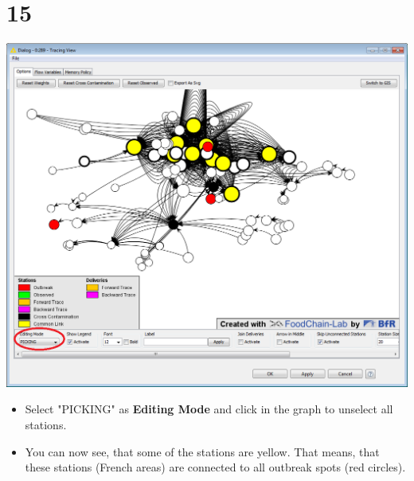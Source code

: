 \documentclass{beamer}
\begin{document}
\section{15}
\begin{frame}
	\begin{center}
  		\includegraphics[height=0.6\textheight]{15.png}
	\end{center}
	\begin{itemize}
		\item Select "PICKING" as \textbf{Editing Mode} and click in the graph to unselect all stations.
		\item You can now see, that some of the stations are yellow. That means, that these stations (French areas) are connected to all outbreak spots (red circles).
	\end{itemize}
\end{frame}
\end{document}
